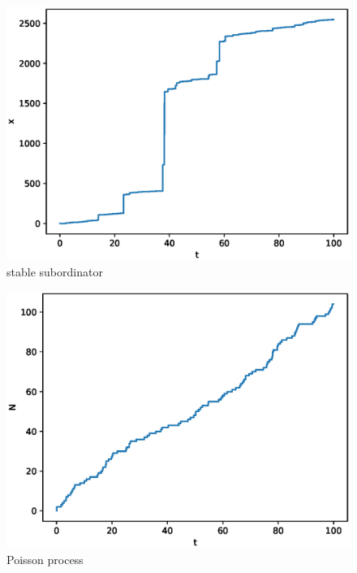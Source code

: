 \documentclass[aps, pre, preprint, amsmath, amssymb]{revtex4}
\begin{document}
\begin{figure}[H]
\centering
\includegraphics[scale=0.5]{figures/subordinator}
\caption{stable subordinator}
\end{figure}
\begin{figure}[H]
\centering
\includegraphics[scale=0.5]{figures/poisson}
\caption{Poisson process}
\end{figure}
\end{document}
